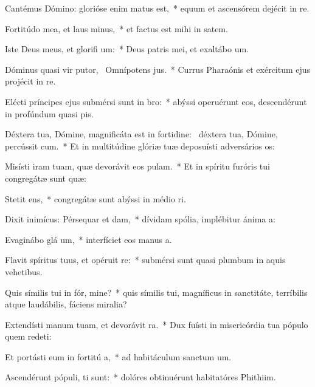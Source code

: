 \item Cantémus Dómino: glorióse enim matus est,~* equum et ascensórem dejécit in re.
\item Fortitúdo mea, et laus  minus,~* et factus est mihi in satem.
\item Iste Deus meus, et glorifi um:~* Deus patris mei, et exaltábo um.
\item Dóminus quasi vir putor,~\pscross{} Omnípotens  jus.~* Currus Pharaónis et exércitum ejus projécit in re.
\item Elécti príncipes ejus submérsi sunt in  bro:~* abýssi operuérunt eos, descendérunt in profúndum quasi pis.
\item Déxtera tua, Dómine, magnificáta est in fortidine:~\pscross{} déxtera tua, Dómine, percússit cum.~* Et in multitúdine glóriæ tuæ deposuísti adversários os:
\item Misísti iram tuam, quæ devorávit eos  pulam.~* Et in spíritu furóris tui congregátæ sunt quæ:
\item Stetit  ens,~* congregátæ sunt abýssi in médio ri.
\item Dixit inimícus: Pérsequar et dam,~* dívidam spólia, implébitur ánima a:
\item Evaginábo glá um,~* interfíciet eos manus a.
\item Flavit spíritus tuus, et opéruit  re:~* submérsi sunt quasi plumbum in aquis vehetibus.
\item Quis símilis tui in fór, mine?~* quis símilis tui, magníficus in sanctitáte, terríbilis atque laudábilis, fáciens miralia?
\item Extendísti manum tuam, et devorávit  ra.~* Dux fuísti in misericórdia tua pópulo quem redeti:
\item Et portásti eum in fortitú a,~* ad habitáculum sanctum um.
\item Ascendérunt pópuli,  ti sunt:~* dolóres obtinuérunt habitatóres Phithiim.

